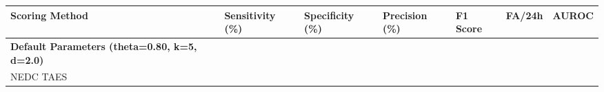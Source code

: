 \documentclass[
]{article}
\begin{document}
\begin{longtable}[]{@{}lllllll@{}}
\toprule
\begin{minipage}[b]{0.12\columnwidth}\raggedright
Scoring Method\strut
\end{minipage} & \begin{minipage}[b]{0.12\columnwidth}\raggedright
Sensitivity (\%)\strut
\end{minipage} & \begin{minipage}[b]{0.12\columnwidth}\raggedright
Specificity (\%)\strut
\end{minipage} & \begin{minipage}[b]{0.12\columnwidth}\raggedright
Precision (\%)\strut
\end{minipage} & \begin{minipage}[b]{0.12\columnwidth}\raggedright
F1 Score\strut
\end{minipage} & \begin{minipage}[b]{0.12\columnwidth}\raggedright
FA/24h\strut
\end{minipage} & \begin{minipage}[b]{0.12\columnwidth}\raggedright
AUROC\strut
\end{minipage}\tabularnewline
\midrule
\endhead
\begin{minipage}[t]{0.12\columnwidth}\raggedright
\textbf{Default Parameters (theta=0.80, k=5, d=2.0)}\strut
\end{minipage} & \begin{minipage}[t]{0.12\columnwidth}\raggedright
\strut
\end{minipage} & \begin{minipage}[t]{0.12\columnwidth}\raggedright
\strut
\end{minipage} & \begin{minipage}[t]{0.12\columnwidth}\raggedright
\strut
\end{minipage} & \begin{minipage}[t]{0.12\columnwidth}\raggedright
\strut
\end{minipage} & \begin{minipage}[t]{0.12\columnwidth}\raggedright
\strut
\end{minipage} & \begin{minipage}[t]{0.12\columnwidth}\raggedright
\strut
\end{minipage}\tabularnewline
\begin{minipage}[t]{0.12\columnwidth}\raggedright
NEDC TAES\strut
\end{minipage} & \begin{minipage}[t]{0.12\columnwidth}\raggedright

\end{minipage}
\end{longtable}
\end{document}
